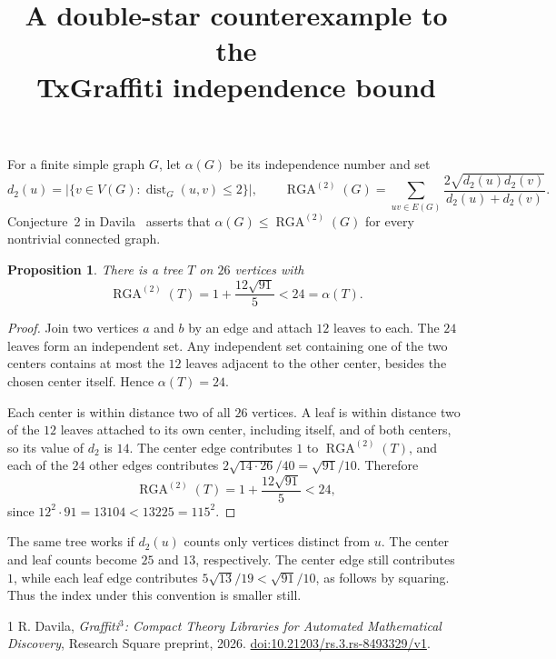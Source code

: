 \documentclass[11pt]{article}
\title{A double-star counterexample to the\texorpdfstring{\\}{ }TxGraffiti independence bound}
\author{}
\date{}
\newtheorem{proposition}{Proposition}
\newcommand{\rga}{\operatorname{RGA}^{(2)}}
\begin{document}
\maketitle

For a finite simple graph $G$, let $\alpha(G)$ be its independence number and set
\[
 d_2(u)=\bigl|\{v\in V(G):\operatorname{dist}_G(u,v)\le 2\}\bigr|,
 \qquad
 \rga(G)=\sum_{uv\in E(G)}
 \frac{2\sqrt{d_2(u)d_2(v)}}{d_2(u)+d_2(v)}.
\]
Conjecture~2 in Davila~\cite[\S3.1]{davila} asserts that
$\alpha(G)\le \rga(G)$ for every nontrivial connected graph.

\begin{proposition}
There is a tree $T$ on $26$ vertices with
\[
 \rga(T)=1+\frac{12\sqrt{91}}5<24=\alpha(T).
\]
\end{proposition}

\begin{proof}
Join two vertices $a$ and $b$ by an edge and attach $12$ leaves to each.
The $24$ leaves form an independent set. Any independent set containing
one of the two centers contains at most the $12$ leaves adjacent to the
other center, besides the chosen center itself. Hence $\alpha(T)=24$.

Each center is within distance two of all $26$ vertices. A leaf is within
distance two of the $12$ leaves attached to its own center, including
itself, and of both centers, so its value of $d_2$ is $14$. The center
edge contributes $1$ to $\rga(T)$, and each of the $24$ other edges
contributes $2\sqrt{14\cdot26}/40=\sqrt{91}/10$. Therefore
\[
 \rga(T)=1+\frac{12\sqrt{91}}5<24,
\]
since $12^2\cdot91=13104<13225=115^2$.
\end{proof}

The same tree works if $d_2(u)$ counts only vertices distinct from $u$.
The center and leaf counts become $25$ and $13$, respectively. The
center edge still contributes $1$, while each leaf edge contributes
$5\sqrt{13}/19<\sqrt{91}/10$, as follows by squaring. Thus the index
under this convention is smaller still.

\begin{thebibliography}{1}
R. Davila, \emph{Graffiti$^3$: Compact Theory Libraries for Automated
Mathematical Discovery}, Research Square preprint, 2026.
\href{https://doi.org/10.21203/rs.3.rs-8493329/v1}{doi:10.21203/rs.3.rs-8493329/v1}.
\end{thebibliography}
\end{document}
